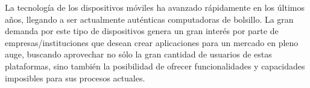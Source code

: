 La tecnología de los dispositivos móviles ha avanzado rápidamente en los últimos años, llegando a ser actualmente auténticas computadoras de bolsillo. La gran demanda por este tipo de dispositivos genera un gran interés por parte de empresas/instituciones que desean crear aplicaciones para un mercado en pleno auge, buscando aprovechar no sólo la gran cantidad de usuarios de estas plataformas, sino también la posibilidad de ofrecer funcionalidades y capacidades imposibles para sus procesos actuales.


